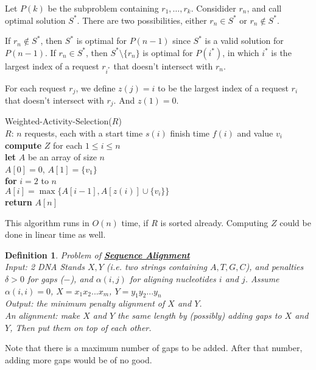 \documentclass[twoside]{article}
\newcommand{\pc}[1]{\mbox{\textbf{#1}}} %
\newtheorem{protodefinition}[prototheorem]{Definition}
\newenvironment{definition}
{\colorlet{shadecolor}{cyan!15}\begin{shaded}\begin{protodefinition}\normalfont}
		{\end{protodefinition}\end{shaded}}
\begin{document}
Let $P(k)$ be the subproblem containing $r_1, \ldots, r_k$. Considider $r_n$, and call optimal solution $S^*$. There are two possibilities, either $r_n \in S^*$ or $r_n \notin S^*$. 

If $r_n \notin S^*$, then $S^*$ is optimal for $P(n-1)$ since $S^*$ is a valid solution for $P(n-1)$. If $r_n \in S^*$, then $S^* \setminus \{r_n\}$ is optimal for $P(i^*)$, in which $i^*$ is the largest index of a request $r_{i^*}$ that doesn't intersect with $r_n$. 

For each request $r_j$, we define $z(j) = i$ to be the largest index of a request $r_{i}$ that doesn't intersect with $r_j$. And $z(1) = 0$. 

\begin{algorithme}
	Weighted-Activity-Selection($R$)\\
	\>$R$: $n$ requests, each with a start time $s(i)$ finish time $f(i)$ and value $v_i$\\
	\> \pc{compute} $Z$ for each $1 \leq i \leq n$\\
	\>\pc{let} $A$ be an array of size $n$\\
	\> $A[0] = 0$, $A[1] = \{v_1\}$\\
	\>\pc{for} $i = 2$ to $n$\\
	\>\>$A[i] = \max\{A[i-1], A[z(i)] \cup \{v_i\}\}$\\
	\>\pc{return} $A[n]$
\end{algorithme}
This algorithm runs in $O(n)$ time, if $R$ is sorted already. Computing $Z$ could be done in linear time as well. 

\begin{definition}
	Problem of \textbf{\underline{Sequence Alignment}}\\
	Input: 2 DNA Stands $X, Y$ (i.e. two strings containing $A,T,G,C$), and penalties $\delta > 0$ for gaps ($-$), and $\alpha(i, j)$ for aligning nucleotides $i$ and $j$. Assume $\alpha(i, i) = 0$, $X = x_1x_2...x_m$, $Y = y_1y_2...y_n$\\
	Output: the minimum penalty alignment of $X$ and $Y$. \\
	An alignment: make $X$ and $Y$ the same length by (possibly) adding gaps to $X$ and $Y$, Then put them on top of each other. 
\end{definition}
Note that there is a maximum number of gaps to be added. After that number, adding more gaps would be of no good. 
\end{document}
